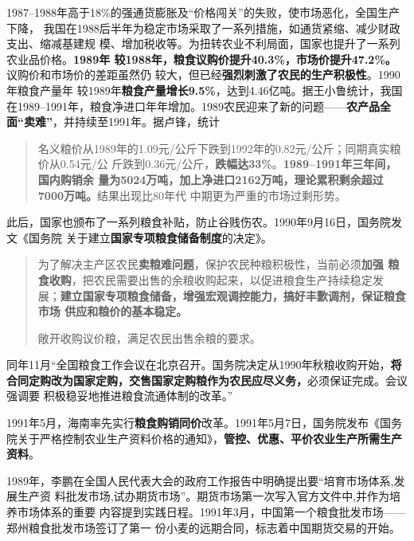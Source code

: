 1987--1988年高于18\%的强通货膨胀及“价格闯关”的失败，使市场恶化，全国生产下降，
我国在1988后半年为稳定市场采取了一系列措施，如通货紧缩、减少财政支出、缩减基建规
模、增加税收等。为扭转农业不利局面，国家也提升了一系列农业品价格。\textbf{1989年
  较1988年，粮食议购价提升40.3\%，市场价提升47.2\%。} 议购价和市场价的差距虽然仍
较大，但已经\textbf{强烈刺激了农民的生产积极性}。1990年粮食产量年
较1989年\textbf{粮食产量增长9.5\%}，达到4.46亿吨。据王小鲁统计，我国
在1989--1991年，粮食净进口年年增加。1989农民迎来了新的问题——\textbf{农产品全
  面“卖难”}，并持续至1991年。据卢锋，统计
\begin{quotation}
  名义粮价从1989年的1.09元/公斤下跌到1992年的0.82元/公斤；同期真实粮价从0.54元/公
  斤跌到0.36元/公斤，\textbf{跌幅达33\%}。\textbf{1989--1991年三年间，国内购销余
    量为5024万吨，加上净进口2162万吨，理论累积剩余超过7000万吨。}结果出现比80年代
  中期更为严重的市场过剩形势。
\end{quotation}

此后，国家也颁布了一系列粮食补贴，防止谷贱伤农。1990年9月16日，国务院发文《国务院
关于建立\textbf{国家专项粮食储备制度}的决定》。
\begin{quotation}
  为了解决主产区农民\textbf{卖粮难问题}，保护农民种粮积极性，当前必须\textbf{加强
    粮食收购}，把农民需要出售的余粮收购起来，以促进粮食生产持续稳定发
  展；\textbf{建立国家专项粮食储备，增强宏观调控能力，搞好丰歉调剂，保证粮食市场
  供应和粮价的基本稳定。}

敞开收购议价粮，满足农民出售余粮的要求。
\end{quotation}

同年11月“全国粮食工作会议在北京召开。国务院决定从1990年秋粮收购开始，\textbf{将
  合同定购改为国家定购，交售国家定购粮作为农民应尽义务，}必须保证完成。会议强调要
积极稳妥地推进粮食流通体制的改革。”

1991年5月，海南率先实行\textbf{粮食购销同价}改革。1991年5月7日，国务院发布《国务
院关于严格控制农业生产资料价格的通知》，\textbf{管控、优惠、平价农业生产所需生产
  资料}。

1989年，李鹏在全国人民代表大会的政府工作报告中明确提出要“培育市场体系,发展生产资
料批发市场,试办期货市场”。期货市场第一次写入官方文件中,并作为培养市场体系的重要
内容提到实践日程。1991年3月，中国第一个粮食批发市场——郑州粮食批发市场签订了第一
份小麦的远期合同，标志着中国期货交易的开始。\cite{taochangsheng}



